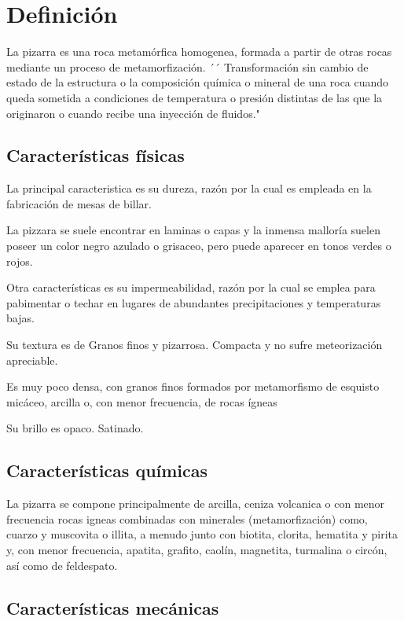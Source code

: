 \section {Definición}

	La pizarra es una roca metamórfica homogenea, formada a partir de otras rocas mediante un proceso de metamorfización. ´´ Transformación sin cambio de estado de la estructura o la composición química o mineral de una roca cuando queda sometida a condiciones de temperatura o presión distintas de las que la originaron o cuando recibe una inyección de fluidos."

	\subsection {Características físicas}
	La principal caracteristica es su dureza, razón por la cual es empleada en la fabricación de mesas de billar.

	La pizzara se suele encontrar en laminas o capas y la inmensa malloría suelen poseer un color negro azulado o grisaceo, pero puede aparecer en tonos  verdes o rojos.

	Otra características es su impermeabilidad, razón por la cual se emplea para pabimentar o techar en lugares de abundantes precipitaciones y temperaturas bajas. 

Su textura es de Granos finos y pizarrosa. Compacta y no sufre meteorización apreciable.

Es muy poco densa, con granos finos formados por metamorfismo de esquisto micáceo, arcilla o, con menor frecuencia, de rocas ígneas

Su brillo es opaco. Satinado.

	\subsection {Características químicas}

La pizarra se compone principalmente de arcilla, ceniza volcanica o con menor frecuencia rocas igneas combinadas con minerales (metamorfización) como, cuarzo y muscovita o illita, a menudo junto con biotita, clorita, hematita y pirita y, con menor frecuencia, apatita, grafito, caolín, magnetita, turmalina o circón, así como de feldespato.

	\subsection {Características mecánicas}
 
